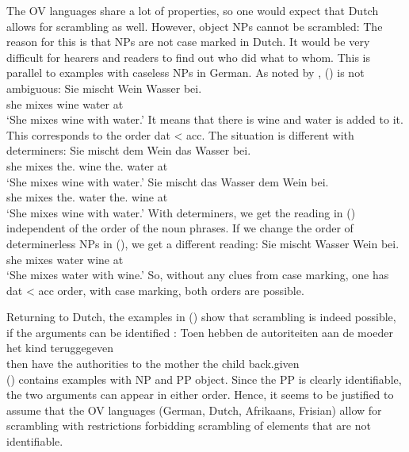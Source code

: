 The OV languages share a lot of properties, so one would expect that Dutch allows for scrambling as
well. However, object NPs cannot be scrambled:
\z
The reason for this is that NPs are not case marked in Dutch. It would be very difficult for hearers
and readers to find out who did what to whom. This is parallel to examples with caseless NPs in
German. As noted by \citet[]{Wegener85b}, () is not ambiguous:
\ea
\gll Sie mischt Wein Wasser bei.\\
     she mixes  wine water  at\\\german
\glt `She mixes wine with water.'
\z
It means that there is wine and water is added to it. This corresponds to the order dat < acc.
The situation is different with determiners:
\eal
\ex 
\gll Sie mischt dem Wein das Wasser bei.\\
     she mixes  the.\DAT{} wine the.\ACC{} water at\\\german
\glt `She mixes wine with water.'
\ex Sie mischt das        Wasser dem        Wein bei.\\
    she mixes  the.\ACC{} water  the.\DAT{} wine at\\
\glt `She mixes wine with water.'
\zl
With determiners, we get the reading in () independent of the order of the noun phrases. If
we change the order of determinerless NPs in (), we get a different reading:
\ea
\gll Sie mischt Wasser Wein bei.\\
     she mixes  water wine  at\\\german
\glt `She mixes water with wine.'
\z
So, without any clues from case marking, one has dat < acc order, with case marking, both orders are possible.

Returning to Dutch, the examples in () show that scrambling is indeed possible, if the arguments can be
identified \parencites[]{GHdRvdT1984a-ed}[]{Haider2010a}:
\eal
\ex
{}
\ex 
\gll Toen hebben de  autoriteiten aan de moeder  het kind  teruggegeven\\
     then have   the authorities  to  the mother the child back.given\\
\zl
() contains examples with NP and PP object. Since the PP is clearly identifiable, the two
arguments can appear in either order. Hence, it seems to be justified to assume that the OV languages (German,
Dutch, Afrikaans, Frisian) allow for scrambling with restrictions forbidding scrambling of elements that
are not identifiable.


